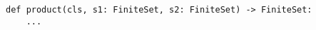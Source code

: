 \begin{verbatim}
def product(cls, s1: FiniteSet, s2: FiniteSet) -> FiniteSet:
    ...
\end{verbatim}